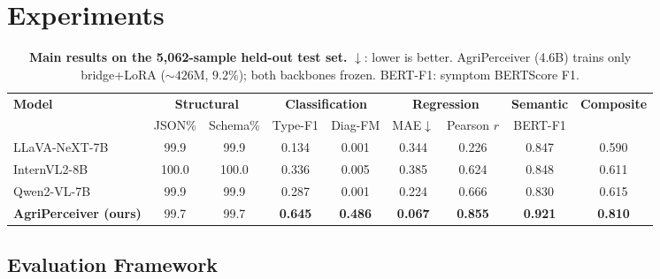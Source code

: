 \documentclass{article}
\newcommand{\ours}{AgriPerceiver}
\begin{document}
\section{Experiments}
\label{sec:exp}

\begin{table}[!t]
  \centering
  \caption{\textbf{Main results on the 5,062-sample held-out test set.}
    $\downarrow$: lower is better.
    \ours{} (4.6B) trains only bridge+LoRA (${{\sim}}426$M, $9.2\%$);
    both backbones frozen.
    BERT-F1: symptom BERTScore F1.}
  \label{tab:main}
  \small
  \setlength{\tabcolsep}{5pt}
  \begin{tabular}{@{}l cc cc cc c c@{}}
    \toprule
    \multirow{2}{*}{\textbf{Model}}
      & \multicolumn{2}{c}{\textbf{Structural}}
      & \multicolumn{2}{c}{\textbf{Classification}}
      & \multicolumn{2}{c}{\textbf{Regression}}
      & \textbf{Semantic}
      & \multirow{2}{*}{\textbf{Composite}} \\
    \cmidrule(lr){2-3}\cmidrule(lr){4-5}\cmidrule(lr){6-7}\cmidrule(lr){8-8}
      & JSON\% & Schema\%
      & Type-F1 & Diag-FM
      & MAE$\downarrow$ & Pearson $r$
      & BERT-F1 & \\
    \midrule
    LLaVA-NeXT-7B~\citep{liu2024llavanext}
      & 99.9 & 99.9 & 0.134 & 0.001 & 0.344 & 0.226 & 0.847 & 0.590 \\
    InternVL2-8B~\citep{chen2024internvl}
      & 100.0 & 100.0 & 0.336 & 0.005 & 0.385 & 0.624 & 0.848 & 0.611 \\
    Qwen2-VL-7B~\citep{wang2024qwen2vl}
      & 99.9 & 99.9 & 0.287 & 0.001 & 0.224 & 0.666 & 0.830 & 0.615 \\
    \midrule
    \textbf{\ours{} (ours)}
      & 99.7 & 99.7
      & \textbf{0.645} & \textbf{0.486}
      & \textbf{0.067} & \textbf{0.855}
      & \textbf{0.921} & \textbf{0.810} \\
    \bottomrule
  \end{tabular}
\end{table}

\subsection{Evaluation Framework}
\end{document}
